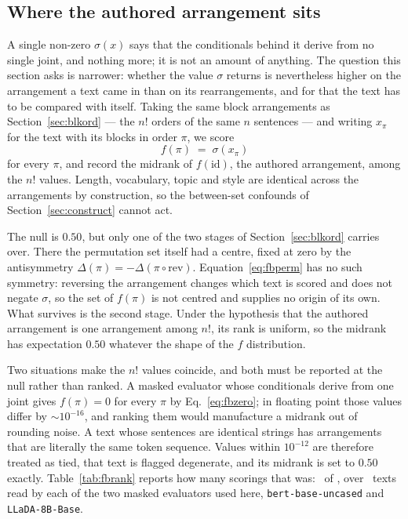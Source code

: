 \subsection{Where the authored arrangement sits}
\label{sec:fbrank}

A single non-zero $\sigma(x)$ says that the conditionals behind it derive
from no single joint, and nothing more; it is not an amount of anything.
The question this section asks is narrower: whether the value $\sigma$
returns is nevertheless higher on the arrangement a text came in than on its
rearrangements, and for that the text has to be compared with itself.  Taking the same block arrangements as
Section~\ref{sec:blkord} --- the $n!$ orders of the same $n$ sentences --- and
writing $x_\pi$ for the text with its blocks in order $\pi$, we score
\begin{equation}
f(\pi) \;=\; \sigma(x_\pi)
\label{eq:fbperm}
\end{equation}
for every $\pi$, and record the midrank of $f(\mathrm{id})$, the authored arrangement,
among the $n!$ values.  Length, vocabulary, topic and style are identical
across the arrangements by construction, so the between-set confounds of
Section~\ref{sec:construct} cannot act.

The null is $0.50$, but only one of the two stages of Section~\ref{sec:blkord} carries over.  There the permutation set itself had
a centre, fixed at zero by the antisymmetry $\Delta(\pi) = -\Delta(\pi \circ
\mathrm{rev})$.  Equation~\eqref{eq:fbperm} has no such symmetry: reversing the arrangement changes which text is scored and does not negate $\sigma$,
so the set of $f(\pi)$ is not centred and supplies no origin of its own.  What survives is the second stage.  Under the hypothesis that the authored arrangement
is one arrangement among $n!$, its rank is uniform, so the midrank has
expectation $0.50$ whatever the shape of the $f$ distribution.

Two situations make the $n!$ values coincide, and both must be reported at
the null rather than ranked.  A masked evaluator whose conditionals derive
from one joint gives $f(\pi) = 0$ for every $\pi$ by
Eq.~\eqref{eq:fbzero}; in floating point those values differ by
$\sim\!10^{-16}$, and ranking them would manufacture a midrank out of
rounding noise.  A text whose sentences are identical strings has
arrangements that are literally the same token sequence.  Values within
$10^{-12}$ are therefore treated as tied, that text is flagged degenerate,
and its midrank is set to $0.50$ exactly.  Table~\ref{tab:fbrank} reports how
many scorings that was: \FbDegenTotal\ of \FbNScorings, over
\FbNTexts\ texts read by each of the two masked evaluators used here,
\texttt{bert-base-uncased} and \texttt{LLaDA-8B-Base}.

